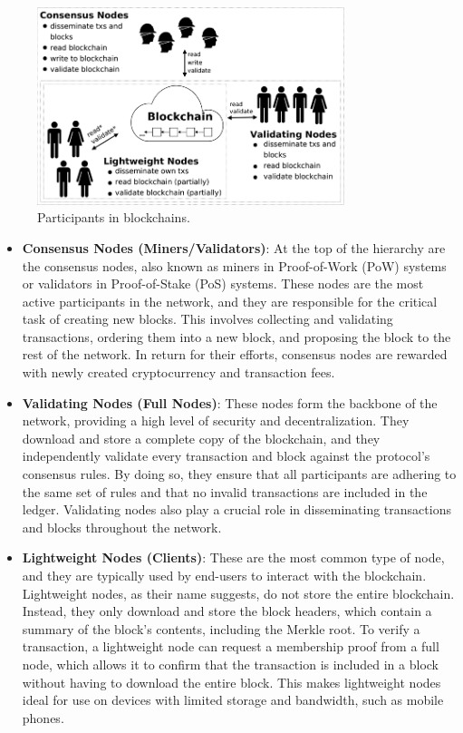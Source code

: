 \begin{figure}[t]
	\begin{center}
		\includegraphics[width=0.8\textwidth]{./figs/participants.png} 
		\caption{Participants in blockchains.}		
		\label{fig:participants}
	\end{center}	
\end{figure}


\begin{itemize}
	\item
	\textbf{Consensus Nodes (Miners/Validators)}: At the top of the
	hierarchy are the consensus nodes, also known as miners in
	Proof-of-Work (PoW) systems or validators in Proof-of-Stake (PoS)
	systems. These nodes are the most active participants in the network,
	and they are responsible for the critical task of creating new blocks.
	This involves collecting and validating transactions, ordering them
	into a new block, and proposing the block to the rest of the network.
	In return for their efforts, consensus nodes are rewarded with newly
	created cryptocurrency and transaction fees.
	\item
	\textbf{Validating Nodes (Full Nodes)}: These nodes form the backbone
	of the network, providing a high level of security and
	decentralization. They download and store a complete copy of the
	blockchain, and they independently validate every transaction and
	block against the protocol's consensus rules. By doing so, they ensure
	that all participants are adhering to the same set of rules and that
	no invalid transactions are included in the ledger. Validating nodes
	also play a crucial role in disseminating transactions and blocks
	throughout the network.
	\item
	\textbf{Lightweight Nodes (Clients)}: These are the most common type
	of node, and they are typically used by end-users to interact with the
	blockchain. Lightweight nodes, as their name suggests, do not store
	the entire blockchain. Instead, they only download and store the block
	headers, which contain a summary of the block's contents, including
	the Merkle root. To verify a transaction, a lightweight node can
	request a membership proof from a full node, which allows it to
	confirm that the transaction is included in a block without having to
	download the entire block. This makes lightweight nodes ideal for use
	on devices with limited storage and bandwidth, such as mobile phones.
\end{itemize}

